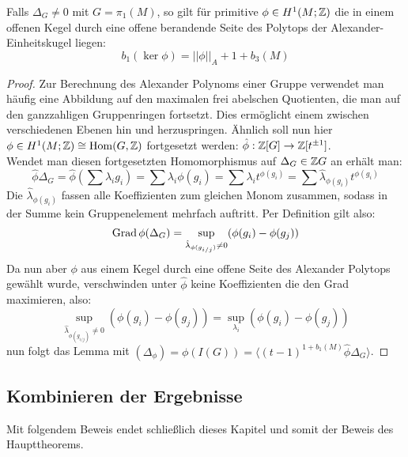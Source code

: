\begin{lem}
\label{lem:alexnorm}
	Falls $\Delta_G \neq 0$ mit $G=\pi_1(M)$, so gilt für primitive $\phi \in H^1(M;\mathbb{Z})$ die in einem offenen Kegel durch eine offene berandende Seite des Polytops der Alexander-Einheitskugel liegen:
	\[
		b_1(\ker\phi) = ||\phi||_A + 1 + b_3(M)
	\]
\end{lem}
\begin{proof}
	Zur Berechnung des Alexander Polynoms einer Gruppe verwendet man häufig eine Abbildung auf den maximalen frei abelschen Quotienten, die man auf den ganzzahligen Gruppenringen fortsetzt. Dies ermöglicht einem zwischen verschiedenen Ebenen hin und herzuspringen. Ähnlich soll nun hier $\phi \in H^1(M;\mathbb{Z}) \cong \operatorname{Hom}(G,\mathbb{Z}) $ fortgesetzt werden: $		\hat \phi:\mathbb{Z}[G] \to \mathbb{Z}[t^{\pm 1}]$.\\
	Wendet man diesen fortgesetzten Homomorphismus auf $\Delta_G\in \mathbb{Z} G$ an erhält man: \[
		\hat \phi \Delta_G = \hat \phi (\sum \lambda_i g_i)= \sum \lambda_i \phi(g_i) = \sum \lambda_i t^{\phi(g_i)} = \sum \hat \lambda_{\phi(g_i)} t^{\phi(g_i)}
	\]
	Die $\hat \lambda_{\phi(g_i)}$ fassen alle Koeffizienten zum gleichen Monom zusammen, sodass in der Summe kein Gruppenelement mehrfach auftritt. Per Definition gilt also:
	\[
		\operatorname{Grad} \phi(\Delta_G) = \sup_{\hat \lambda_{\phi(g_{i/j})} \neq 0} (\phi(g_i)- \phi(g_j))
	\]
	Da nun aber $\phi$ aus einem Kegel durch eine offene Seite des Alexander Polytops gewählt wurde, verschwinden unter $\hat \phi$ keine Koeffizienten die den Grad maximieren, also:
	\[
		\sup_{\hat \lambda_{\phi(g_{i/j})} \neq 0} (\phi(g_i)- \phi(g_j)) = \sup_{\lambda_i}(\phi(g_i)- \phi(g_j))
	\]
	nun folgt das Lemma mit $(\Delta_\phi)=\phi(I(G))=\langle(t-1)^{1+b_1(M)}\hat\phi\Delta_G \rangle	$.
\end{proof}

\subsection{Kombinieren der Ergebnisse}
    
Mit folgendem Beweis endet schließlich dieses Kapitel und somit der Beweis des Haupttheorems.

